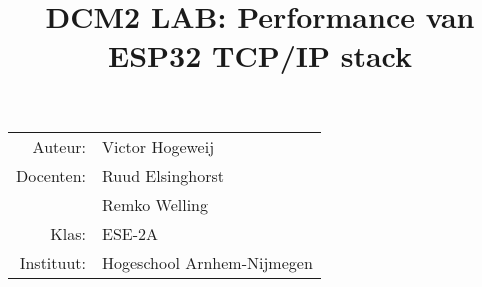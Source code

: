 \documentclass{article}
\title{DCM2 LAB: Performance van ESP32 TCP/IP stack}
\date{\null}
\author{\null}
\begin{document}
  \maketitle
\begin{figure*}[btp]
\begin{tabular}{r@{ }l}
  		  Auteur:      & Victor Hogeweij \\[1ex] 
		  Docenten: & Ruud Elsinghorst\\
          			   & Remko Welling\\[1ex]
          Klas:		   & ESE-2A\\[1ex]
          Instituut:   & Hogeschool Arnhem-Nijmegen

          
\end{tabular}
\end{figure*}
  \newpage
  \tableofcontents
  \newpage
  
\end{document}
